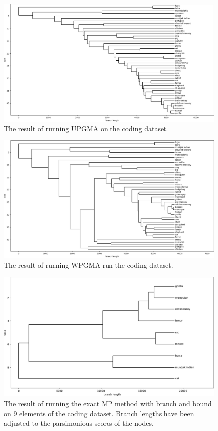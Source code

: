 \documentclass[11pt,twocolumn]{article}
\begin{document}
\begin{figure}
    \centering
    \includegraphics[width=\linewidth]{img/upgma.png}
    \caption{The result of running UPGMA on the coding dataset.}
    \label{fig:upgma}
\end{figure}

\begin{figure}
    \centering
    \includegraphics[width=\linewidth]{img/wpgma.png}
    \caption{The result of running WPGMA run the coding dataset.}
    \label{fig:wpgma}
\end{figure}

\begin{figure}
    \centering
    \includegraphics[width=\linewidth]{img/mp_9_taxa.png}
    \caption{The result of running the exact MP method with branch and bound on 9 elements of the coding dataset. Branch lengths have been adjusted to the parsimonious scores of the nodes.}
    \label{fig:mp}
\end{figure}
\end{document}
